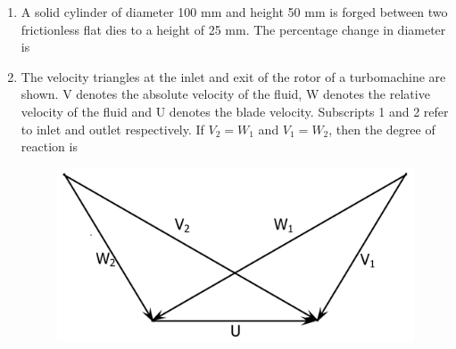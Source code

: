 \documentclass[journal,11pt,onecolumn]{IEEEtran}
\begin{document}
\begin{enumerate}
          \begin{enumerate}
          \end{enumerate}

    \item A solid cylinder of diameter 100 mm and height 50 mm is forged between two frictionless flat dies to a height of 25 mm. The percentage change in diameter is

          \begin{enumerate}
          \end{enumerate}

    \item The velocity triangles at the inlet and exit of the rotor of a turbomachine are shown. V denotes the absolute velocity of the fluid, W denotes the relative velocity of the fluid and U denotes the blade velocity. Subscripts 1 and 2 refer to inlet and outlet respectively. If \(V_2 = W_1\) and \(V_1 = W_2\), then the degree of reaction is

          \begin{figure}[H]
              \centering
              \includegraphics[scale=0.2]{q17}
              \caption{}
              \label{q17}
          \end{figure}


\end{enumerate}
\end{document}
